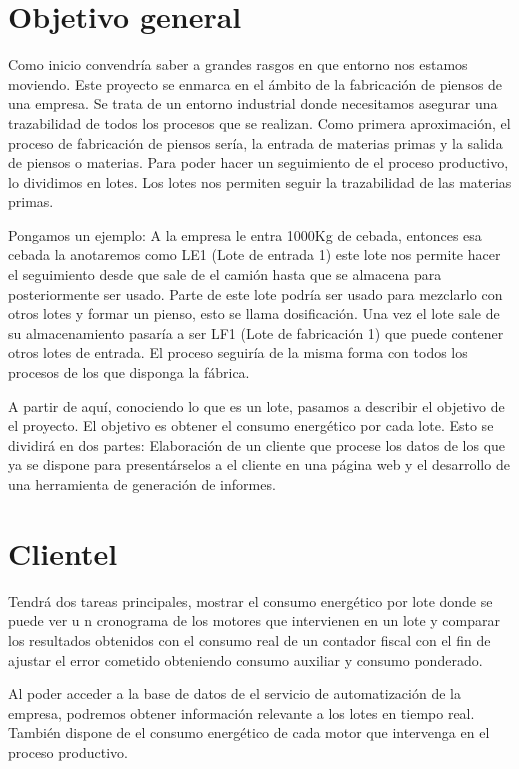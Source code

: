 \section*{Objetivo general}

Como inicio convendría saber a grandes rasgos en que entorno nos estamos moviendo.
 Este proyecto se enmarca en el ámbito de la fabricación de piensos de una empresa.
 Se trata de un entorno industrial donde necesitamos asegurar una trazabilidad de todos los
 procesos que se realizan. Como primera aproximación, el proceso de fabricación de piensos
 sería, la entrada de materias primas y la salida de piensos o materias. Para poder hacer
 un seguimiento de el proceso productivo, lo dividimos en lotes. Los lotes nos permiten
 seguir la trazabilidad de las materias primas.

Pongamos un ejemplo: A la empresa le entra 1000Kg de cebada, entonces esa cebada la
 anotaremos como LE1 (Lote de entrada 1) este lote nos permite hacer el seguimiento 
desde que sale de el camión hasta que se almacena para posteriormente ser usado.
 Parte de este lote podría ser usado para mezclarlo con otros lotes y formar un pienso,
 esto se llama dosificación. Una vez el lote sale de su almacenamiento pasaría a ser 
LF1 (Lote de fabricación 1) que puede contener otros lotes de entrada. 
El proceso seguiría de la misma forma con todos los procesos de los que disponga la fábrica.

A partir de aquí, conociendo lo que es un lote, pasamos a describir el objetivo de el proyecto.
 El objetivo es obtener el consumo energético por cada lote. Esto se dividirá en dos partes:
 Elaboración de un cliente que procese los datos de los que ya se dispone para presentárselos
 a el cliente en una página web y el desarrollo de una herramienta de generación de informes.

\section*{Clientel}

Tendrá dos tareas principales, mostrar el consumo energético por lote donde se puede ver u
n cronograma de los motores que intervienen en un lote y comparar los resultados obtenidos
 con el consumo real de un contador fiscal con el fin de ajustar el error cometido obteniendo 
consumo auxiliar y consumo ponderado.

Al poder acceder a la base de datos de el servicio de automatización de la empresa, podremos
 obtener información relevante a los lotes en tiempo real. También dispone de el consumo 
energético de cada motor que intervenga en el proceso productivo.

